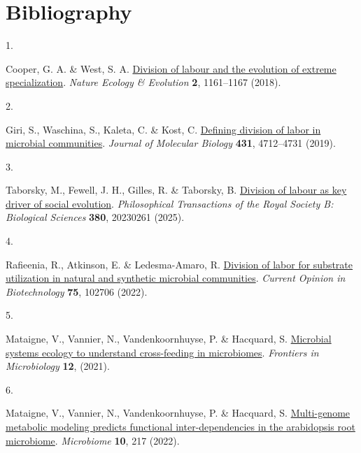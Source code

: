 \documentclass[
  11pt,
  a4paper,
]{report}
\newlength{\cslhangindent}
\newlength{\csllabelwidth}
\newenvironment{CSLReferences}[2] %
 {\begin{list}{}{%
  \setlength{\itemindent}{0pt}
  \setlength{\leftmargin}{0pt}
  \setlength{\parsep}{0pt}
  \ifodd #1
   \setlength{\leftmargin}{\cslhangindent}
   \setlength{\itemindent}{-1\cslhangindent}
  \fi
  \setlength{\itemsep}{#2\baselineskip}}}
 {\end{list}}
\newcommand{\CSLLeftMargin}[1]{\parbox[t]{\csllabelwidth}{\strut#1\strut}}
\newcommand{\CSLRightInline}[1]{\parbox[t]{\linewidth - \csllabelwidth}{\strut#1\strut}}
\begin{document}

\chapter*{Bibliography}\label{bibliography}


\label{refs}
\begin{CSLReferences}{0}{0}
\CSLLeftMargin{1. }%
\CSLRightInline{Cooper, G. A. \& West, S. A.
\href{https://doi.org/10.1038/s41559-018-0564-9}{Division of labour and
the evolution of extreme specialization}. \emph{Nature Ecology \&
Evolution} \textbf{2}, 1161--1167 (2018).}

\CSLLeftMargin{2. }%
\CSLRightInline{Giri, S., Waschina, S., Kaleta, C. \& Kost, C.
\href{https://doi.org/10.1016/j.jmb.2019.06.023}{Defining division of
labor in microbial communities}. \emph{Journal of Molecular Biology}
\textbf{431}, 4712--4731 (2019).}

\CSLLeftMargin{3. }%
\CSLRightInline{Taborsky, M., Fewell, J. H., Gilles, R. \& Taborsky, B.
\href{https://doi.org/10.1098/rstb.2023.0261}{Division of labour as key
driver of social evolution}. \emph{Philosophical Transactions of the
Royal Society B: Biological Sciences} \textbf{380}, 20230261 (2025).}

\CSLLeftMargin{4. }%
\CSLRightInline{Rafieenia, R., Atkinson, E. \& Ledesma-Amaro, R.
\href{https://doi.org/10.1016/j.copbio.2022.102706}{Division of labor
for substrate utilization in natural and synthetic microbial
communities}. \emph{Current Opinion in Biotechnology} \textbf{75},
102706 (2022).}

\CSLLeftMargin{5. }%
\CSLRightInline{Mataigne, V., Vannier, N., Vandenkoornhuyse, P. \&
Hacquard, S. \href{https://doi.org/10.3389/fmicb.2021.780469}{Microbial
systems ecology to understand cross-feeding in microbiomes}.
\emph{Frontiers in Microbiology} \textbf{12}, (2021).}

\CSLLeftMargin{6. }%
\CSLRightInline{Mataigne, V., Vannier, N., Vandenkoornhuyse, P. \&
Hacquard, S.
\href{https://doi.org/10.1186/s40168-022-01383-z}{Multi-genome metabolic
modeling predicts functional inter-dependencies in the arabidopsis root
microbiome}. \emph{Microbiome} \textbf{10}, 217 (2022).}


\end{CSLReferences}
\end{document}
